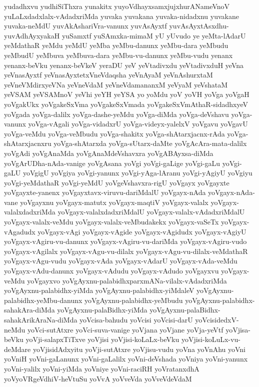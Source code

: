 {yudadhxvu
yudhiSiThxra
yunakitx
yuyoVdhayxsamxjujxhurANameVnoV
yuLaLxdadxlalx-vAdadxriMda
yuvaka
yuvakana
yuvaka-nidadxnu
yuvakane
yuvaka-neMdU
yuvAkAshariVra-vanunx
yuvAsAyxtf
yuvAsAyxtAsxdhu-yuvAdhAyxyakaH
yuSamxtf
yuSAmxka-mimaM
yU
yUvudo
ye
yeMta-lAdarU
yeMdathaR
yeMdu
yeMdU
yeMba
yeMbu-danunx
yeMbu-dara
yeMbudu
yeMbudU
yeMbuva
yeMbuva-dara
yeMbu-vu-danunx
yeMbu-vudu
yenanx
yenanx-beVku
yenanx-beVkeV
yeraDU
yeV
yeVtadivxdu
yeVtadivxduH
yeVna
yeVnasAyxtf
yeVnasAyxtetxVneVdaqsha
yeVnAyaM
yeVnAshurxtaM
yeVneVMdirxyeVNa
yeVneVdaM
yeVneVdamananxM
yeVyaM
yeVshataM
yeVSAM
yeVSAMnoV
yeVhi
yeYH
yeYSA
yo
yoMdu
yoV
yoVH
yoVga
yoVgaH
yoVgakUkx
yoVgakeSxVma
yoVgakeSxVmada
yoVgakeSxVmAthaR-sidadhxyeV
yoVgada
yoVga-dalilx
yoVga-dashe-yeMdu
yoVga-diMda
yoVga-deVshavu
yoVga-vanunx
yoVga-vAgali
yoVga-vidadxrU
yoVga-videyx-yalelxV
yoVgavu
yoVgavU
yoVga-veMdu
yoVga-veMbudu
yoVga-shakitx
yoVga-shAtarxjacnx-rAda
yoVga-shAtarxjacnxru
yoVga-shAtarxda
yoVga-sUtarx-daMte
yoVgAcAra-mata-dalilx
yoVgAdi
yoVgAnaMda
yoVgAnaMdeVshavxra
yoVgABAyxsa-diMda
yoVgArUDha-nAda-vanige
yoVgAsana
yoVgi
yoVgi-gaLige
yoVgi-gaLu
yoVgi-gaLU
yoVgigU
yoVgiya
yoVgi-yanunx
yoVgi-yAga-lAranu
yoVgi-yAgiyU
yoVgiyu
yoVgi-yeMdathaR
yoVgi-yeMdU
yoVgeVshavxra-rigU
yoVgayx
yoVgayxte
yoVgayxte-yanenx
yoVgayxtavx-viruvu-dariMdalU
yoVgayx-nAda
yoVgayx-nAda-vane
yoVgayxnu
yoVgayx-matutx
yoVgayx-maqtiV
yoVgayx-valalx
yoVgayx-valalxdadxriMda
yoVgayx-valalxdadxriMdalU
yoVgayx-valalx-vAdadxriMdalU
yoVgayx-valalx-veMdu
yoVgayx-valalx-veMbudakekx
yoVgayx-vaSeTx
yoVgayx-vAgadudx
yoVgayx-vAgi
yoVgayx-vAgide
yoVgayx-vAgidudx
yoVgayx-vAgiyU
yoVgayx-vAgiru-vu-danunx
yoVgayx-vAgiru-vu-dariMda
yoVgayx-vAgiru-vudo
yoVgayx-vAgilalx
yoVgayx-vAgu-vu-dilalx
yoVgayx-vAgu-vu-dilalx-veMdathaR
yoVgayx-vAgu-vudu
yoVgayx-vAda
yoVgayx-vAdarU
yoVgayx-vAda-veMdu
yoVgayx-vAdu-danunx
yoVgayx-vAdudu
yoVgayx-vAdudo
yoVgayxvu
yoVgayx-veMdu
yoVgayxvo
yoVgAyxnu-palabidhxparxmANa-vilalx-vAdadxriMda
yoVgAyxnu-palabidhx-yiMda
yoVgAyxnu-palabidhx-yiMdaleV
yoVgAyxnu-palabidhx-yeMbu-danunx
yoVgAyxnu-palabidhx-yeMbudu
yoVgAyxnu-palabidhx-sahakAra-diMda
yoVgAyxnu-palaBidhx-yiMda
yoVgAyxnu-palaBidhx-sahakArikAraNa-diMda
yoVcisa-bahudu
yoVcisi
yoVcisi-darU
yoVcisidedxV-neMdu
yoVci-sutAtxre
yoVci-suva-vanige
yoVjana
yoVjane
yoVja-yeVtf
yoVjisa-beVku
yoVji-salapxTiTxve
yoVjisi
yoVjisi-koLaLx-beVku
yoVjisi-koLuLx-vu-deMdare
yoVjisidAdxyitu
yoVji-sutAtxre
yoVjisu-vudu
yoVna
yoVnAhu
yoVni
yoVniH
yoVni-gaLanunx
yoVni-gaLalilx
yoVni-deVshada
yoVniya
yoVni-yanunx
yoVni-yalilx
yoVni-yiMda
yoVniye
yoVni-raciRH
yoVratanxdhA
yoVyoVRgeVdhiV-heVtuSu
yoVvA
yoVveVda
yoVveVdeVdaM
}
